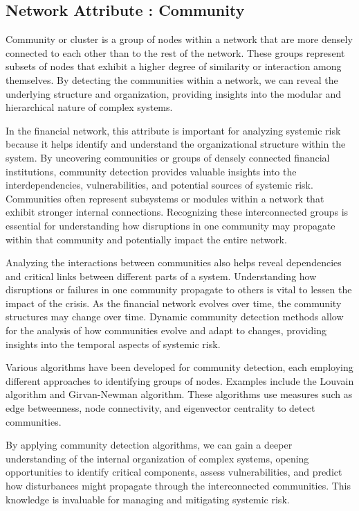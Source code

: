 \documentclass[a4paper,11pt]{article}
\begin{document}
\subsection{Network Attribute : Community}
Community or cluster is a group of nodes within a network that are more densely connected to each other than to the rest of the network. These groups represent subsets of nodes that exhibit a higher degree of similarity or interaction among themselves. By detecting the communities within a network, we can reveal the underlying structure and organization, providing insights into the modular and hierarchical nature of complex systems.

In the financial network, this attribute is important for analyzing systemic risk because it helps identify and understand the organizational structure within the system. By uncovering communities or groups of densely connected financial institutions, community detection provides valuable insights into the interdependencies, vulnerabilities, and potential sources of systemic risk. Communities often represent subsystems or modules within a network that exhibit stronger internal connections. Recognizing these interconnected groups is essential for understanding how disruptions in one community may propagate within that community and potentially impact the entire network.

Analyzing the interactions between communities also helps reveal dependencies and critical links between different parts of a system. Understanding how disruptions or failures in one community propagate to others is vital to lessen the impact of the crisis. As the financial network evolves over time, the community structures may change over time. Dynamic community detection methods allow for the analysis of how communities evolve and adapt to changes, providing insights into the temporal aspects of systemic risk.

Various algorithms have been developed for community detection, each employing different approaches to identifying groups of nodes. Examples include the Louvain algorithm and Girvan-Newman algorithm. These algorithms use measures such as edge betweenness, node connectivity, and eigenvector centrality to detect communities.

By applying community detection algorithms, we can gain a deeper understanding of the internal organization of complex systems, opening opportunities to identify critical components, assess vulnerabilities, and predict how disturbances might propagate through the interconnected communities. This knowledge is invaluable for managing and mitigating systemic risk.
\end{document}
